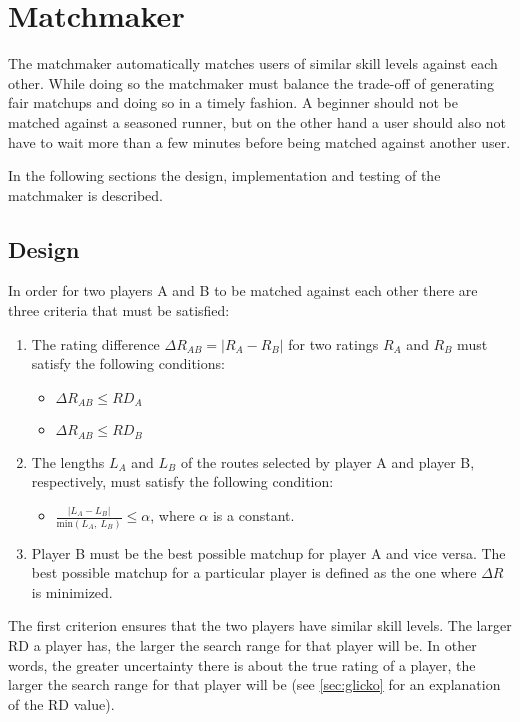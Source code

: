 \section{Matchmaker}
The matchmaker automatically matches users of similar skill levels against each other.
While doing so the matchmaker must balance the trade-off of generating fair matchups and doing so in a timely fashion.
A beginner should not be matched against a seasoned runner, but on the other hand a user should also not have to wait more than a few minutes before being matched against another user.

In the following sections the design, implementation and testing of the matchmaker is described.

\subsection{Design}
In order for two players A and B to be matched against each other there are three criteria that must be satisfied:

\begin{enumerate}
	\item{The rating difference $\Delta R_{AB} = \left|R_A-R_B\right|$ for two ratings $R_A$ and $R_B$ must satisfy the following conditions:}
		\begin{itemize}
			\item{$\Delta R_{AB} \leq RD_A$}
			\item{$\Delta R_{AB} \leq RD_B$}
		\end{itemize}
	\item{The lengths $L_A$ and $L_B$ of the routes selected by player A and player B, respectively, must satisfy the following condition:}
		\begin{itemize}
			\item{$\frac{\left|L_A-L_B\right|}{\mathrm{min}\left(L_A,\:	L_B\right)} \leq \alpha$, where $\alpha$ is a constant.	}
		\end{itemize}
	\item{Player B must be the best possible matchup for player A and vice versa. The best possible matchup for a particular player is defined as the one where $\Delta R$ is minimized.}
\end{enumerate}

The first criterion ensures that the two players have similar skill levels.
The larger RD a player has, the larger the search range for that player will be.
In other words, the greater uncertainty there is about the true rating of a player, the larger the search range for that player will be (see \autoref{sec:glicko} for an explanation of the RD value).


